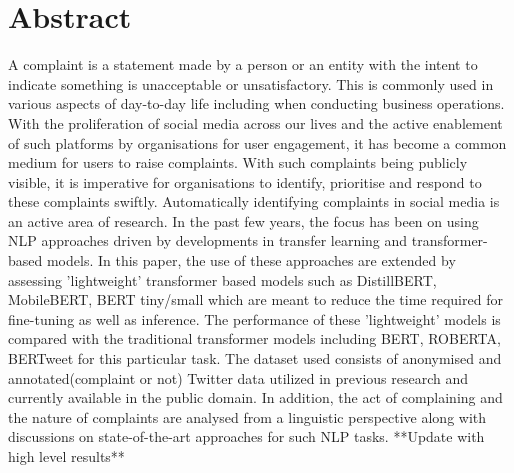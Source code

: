 \chapter*{\Large \center Abstract}

A complaint is a statement made by a person or an entity with the intent to indicate something is unacceptable or unsatisfactory. This is commonly used in various aspects of day-to-day life including when conducting business operations. With the proliferation of social media across our lives and the active enablement of such platforms by organisations for user engagement, it has become a common medium for users to raise complaints. With such complaints being publicly visible, it is imperative for organisations to identify, prioritise and respond to these complaints swiftly. Automatically identifying complaints in social media is an active area of research. In the past few years, the focus has been on using NLP approaches driven by developments in transfer learning and transformer-based models.
\newline \newline
In this paper, the use of these approaches are extended by assessing 'lightweight' transformer based models such as DistillBERT, MobileBERT, BERT tiny/small which are meant to reduce the time required for fine-tuning as well as inference. The performance of these 'lightweight' models is compared with the traditional transformer models including BERT, ROBERTA, BERTweet for this particular task. The dataset used consists of anonymised and annotated(complaint or not) Twitter data utilized in previous research and currently available in the public domain. In addition, the act of complaining and the nature of complaints are analysed from a linguistic perspective along with discussions on state-of-the-art approaches for such NLP tasks.
\newline \newline
**Update with high level results**